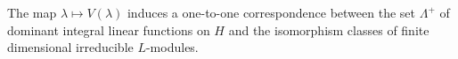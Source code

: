 The map $\lambda \mapsto V(\lambda)$ induces a one-to-one correspondence between the set $\Lambda^+$ of dominant integral linear functions on $H$ and the isomorphism classes of finite dimensional irreducible $L$-modules.
